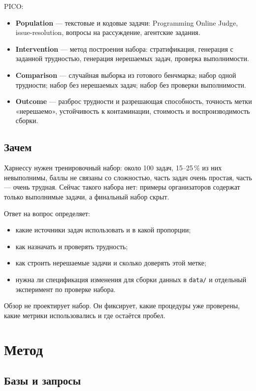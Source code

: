 \documentclass[11pt,a4paper]{article}
\begin{document}
PICO:

\begin{itemize}
  \item \textbf{Population} — текстовые и кодовые задачи: Programming Online
        Judge, issue-resolution, вопросы на рассуждение, агентские задания.
  \item \textbf{Intervention} — метод построения набора: стратификация,
        генерация с заданной трудностью, генерация нерешаемых задач,
        проверка выполнимости.
  \item \textbf{Comparison} — случайная выборка из готового бенчмарка;
        набор одной трудности; набор без нерешаемых задач; набор без
        проверки выполнимости.
  \item \textbf{Outcome} — разброс трудности и разрешающая способность,
        точность метки «нерешаемо», устойчивость к контаминации, стоимость
        и воспроизводимость сборки.
\end{itemize}

\subsection{Зачем}

Харнессу нужен тренировочный набор: около 100 задач, 15--25\,\% из них
невыполнимы, баллы не связаны со сложностью, часть задач очень простая,
часть — очень трудная. Сейчас такого набора нет: примеры организаторов
содержат только выполнимые задачи, а финальный набор скрыт.

Ответ на вопрос определяет:
\begin{itemize}
  \item какие источники задач использовать и в какой пропорции;
  \item как назначать и проверять трудность;
  \item как строить нерешаемые задачи и сколько доверять этой метке;
  \item нужна ли спецификация изменения для сборки данных в \texttt{data/}
        и отдельный эксперимент по проверке набора.
\end{itemize}

Обзор не проектирует набор. Он фиксирует, какие процедуры уже проверены,
какие метрики использовались и где остаётся пробел.

\section{Метод}

\subsection{Базы и запросы}
\end{document}
